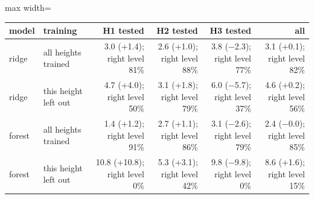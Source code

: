 \begin{adjustbox}{max width=\textwidth}
{\scriptsize
\begin{tabular}{llrrrr}
\toprule
\textbf{model} & \textbf{training} & \textbf{H1 tested} & \textbf{H2 tested} & \textbf{H3 tested} & \textbf{all} \\
\midrule
ridge & all heights trained & 3.0 (+1.4); right level 81\% & 2.6 (+1.0); right level 88\% & 3.8 ($-$2.3); right level 77\% & 3.1 (+0.1); right level 82\% \\
ridge & this height left out & 4.7 (+4.0); right level 50\% & 3.1 (+1.8); right level 79\% & 6.0 ($-$5.7); right level 37\% & 4.6 (+0.2); right level 56\% \\
forest & all heights trained & 1.4 (+1.2); right level 91\% & 2.7 (+1.1); right level 86\% & 3.1 ($-$2.6); right level 79\% & 2.4 ($-$0.0); right level 85\% \\
forest & this height left out & 10.8 (+10.8); right level 0\% & 5.3 (+3.1); right level 42\% & 9.8 ($-$9.8); right level 0\% & 8.6 (+1.6); right level 15\% \\
\bottomrule
\end{tabular}
}
\end{adjustbox}
